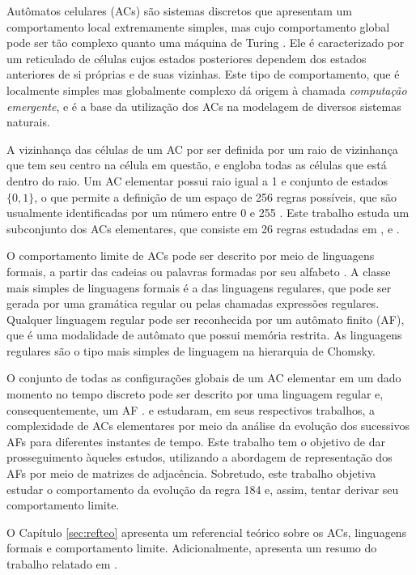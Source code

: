 \documentclass[12pt,a4paper]{article}
\begin{document}
Autômatos celulares (ACs) são sistemas discretos que apresentam um comportamento
local extremamente simples, mas cujo comportamento global pode ser tão
complexo quanto uma máquina de Turing . Ele
é caracterizado por um reticulado de células cujos estados posteriores
dependem dos estados anteriores de si próprias e de suas vizinhas.
Este tipo de comportamento, que é localmente simples mas globalmente
complexo dá origem à chamada \textit{computação emergente}, e é
a base da utilização dos ACs na modelagem de diversos sistemas naturais.

A vizinhança das células de um AC por ser definida por
um raio de vizinhança que tem seu centro na célula em questão, e engloba
todas as células que está dentro do raio. Um AC
elementar possui raio igual a 1 e conjunto de estados $\{0,1\}$, o que
permite a definição de um espaço de 256 regras possíveis, que são
usualmente identificadas por um número entre 0 e 255 .
Este trabalho estuda um subconjunto dos ACs elementares, que consiste
em 26 regras estudadas em ,
 e .

O comportamento limite de ACs pode ser descrito por meio
de linguagens formais, a partir das cadeias ou
palavras formadas por seu alfabeto .
A classe mais simples de linguagens formais é
a das linguagens regulares, que pode ser gerada por uma gramática regular ou
pelas chamadas expressões regulares. Qualquer linguagem regular pode ser
reconhecida por um autômato finito (AF), que é uma modalidade de autômato que
possui memória restrita. As linguagens regulares são o tipo mais simples
de linguagem na hierarquia de Chomsky.

O conjunto de todas as configurações globais de um AC
elementar em um dado momento no tempo discreto pode ser descrito por
uma linguagem regular e, consequentemente, um AF
.  e 
estudaram, em seus respectivos trabalhos, a complexidade de ACs
elementares por meio da análise da evolução dos sucessivos
AFs para diferentes instantes de tempo. Este trabalho
tem o objetivo de dar prosseguimento àqueles estudos, utilizando a abordagem
de representação dos AFs por meio de matrizes de adjacência.
Sobretudo, este trabalho objetiva estudar o comportamento da evolução da
regra 184 e, assim, tentar derivar seu comportamento limite.

O Capítulo \ref{sec:refteo} apresenta um referencial teórico sobre 
os ACs, linguagens formais e comportamento limite.
Adicionalmente, apresenta um resumo do trabalho relatado em
.
\end{document}
